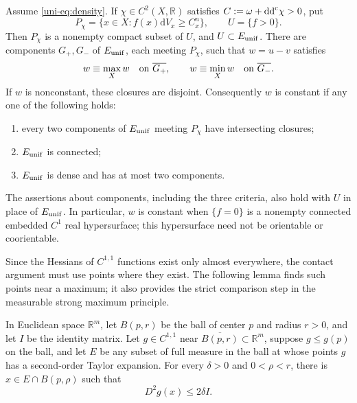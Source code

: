 \begin{theorem}\label{uni-thm:anchors}
Assume \eqref{uni-eq:density}.  If $\chi\in C^2(X,\mathbb R)$ satisfies
$C:=\omega+\mathrm{dd}^{\mathrm{c}}\chi>0$, put
\[
  P_\chi=\{x\in X:f(x)\mathrm{d}V_x\geq C_x^n\},\qquad U=\{f>0\}.
\]
Then $P_\chi$ is a nonempty compact subset of $U$, and
$U\subset E_{\rm unif}$.  There are components $G_+,G_-$ of
$E_{\rm unif}$, each meeting $P_\chi$, such that $w=u-v$ satisfies
\begin{equation}
 w\equiv\max_Xw\quad\hbox{on }\overline{G_+},\qquad
 w\equiv\min_Xw\quad\hbox{on }\overline{G_-}.
 \label{uni-eq:extrema-components}
\end{equation}
If $w$ is nonconstant, these closures are disjoint.  Consequently $w$ is
constant if any one of the following holds:
\begin{enumerate}
\item every two components of $E_{\rm unif}$ meeting $P_\chi$ have
      intersecting closures;
\item $E_{\rm unif}$ is connected;
\item $E_{\rm unif}$ is dense and has at most two components.
\end{enumerate}
The assertions about components, including the three criteria, also hold with $U$ in place of $E_{\rm unif}$.
In particular, $w$ is constant when $\{f=0\}$ is a nonempty connected
embedded $C^1$ real hypersurface; this hypersurface need not be orientable or
coorientable.
\end{theorem}

Since the Hessians of $C^{1,1}$ functions exist only almost everywhere, the contact argument must use points where they exist. The following lemma finds such points near a maximum; it also provides the strict comparison step in the measurable strong maximum principle.

\begin{lemma}\label{uni-lem:goodcontact}
In Euclidean space $\mathbb R^m$, let $B(p,r)$ be the ball of center $p$ and radius $r>0$, and let $I$ be the identity matrix. Let $g\in C^{1,1}$ near $\overline{B(p,r)}\subset\mathbb R^m$, suppose
$g\leq g(p)$ on the ball, and let $E$ be any subset of full measure in the ball at whose points
$g$ has a second-order Taylor expansion.  For every $\delta>0$ and
$0<\rho<r$, there is $x\in E\cap B(p,\rho)$ such that
\[
    D^2g(x)\leq2\delta I.
\]
\end{lemma}

